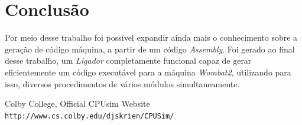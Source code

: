 \documentclass{article}
\begin{document}
\newpage\section{Conclusão}

Por meio desse trabalho foi possível expandir ainda mais o conhecimento sobre a geração de código máquina, a partir de um código \textit{Assembly}. Foi gerado ao final desse trabalho, um \textit{Ligador} completamente funcional capaz de gerar eficientemente um código executável para a máquina \textit{Wombat2}, utilizando para isso, diversos procedimentos de vários módulos simultaneamente.


\begin{thebibliography}{9}

Colby College, Official CPUsim Website
\\\texttt{http://www.cs.colby.edu/djskrien/CPUSim/}
\end{thebibliography}
\end{document}
